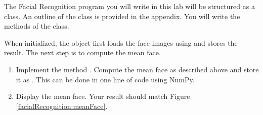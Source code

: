 \begin{problem}
\label{prob:meanFace}
\leavevmode

The Facial Recognition program you will write in this lab will be structured as a class. 
An outline of the  class is provided in the appendix. %
You will write the methods of the class.

When initialized, the  object first loads the face images using  and stores the result.
The next step is to compute the mean face.
\begin{enumerate}
\item Implement the method .
Compute the mean face as described above and store it as .
This can be done in one line of code using NumPy.

\item Display the mean face.
Your result should match Figure \ref{facialRecognition:meanFace}.
\end{enumerate}
\end{problem}



